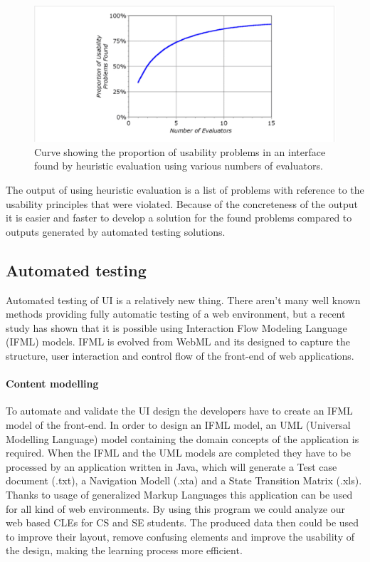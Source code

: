 \documentclass[10pt,english,a4paper]{article}
\begin{document}
\begin{figure}[tbh]
    \includegraphics[width=1\textwidth]{images/heuristic-results.pdf}
    \caption{Curve showing the proportion of usability problems in an interface
     found by heuristic evaluation using various numbers of evaluators\cite{a2020_heuristic}.}
     \label{fig:increase}
\end{figure}
The output of using heuristic evaluation is a list of problems with reference to the usability
principles that were violated\cite{a2020_heuristic}. Because of the concreteness of the output 
it is easier and faster to develop a solution for the found problems compared to outputs generated
by automated testing solutions. 



\subsection{Automated testing}
Automated testing of UI is a relatively new thing\cite{automated_testing_ifml}. There aren't many well known methods
providing fully automatic testing of a web environment, but a recent study has shown that
it is possible using Interaction Flow Modeling Language (IFML) models\cite{automated_testing_ifml}.
IFML is evolved from WebML and its designed to capture the structure, user interaction and control
flow of the front-end of web applications\cite{automated_testing_ifml}.


\paragraph{Content modelling}
To automate and validate the UI design the developers have to create an IFML model
of the front-end. In order to design an IFML model, an UML (Universal Modelling Language) model 
containing the domain concepts of the application is required\cite{automated_testing_ifml}. 
When the IFML and the UML models are completed they have to be processed by an application written 
in Java, which will generate a Test case document (.txt), a Navigation Modell (.xta) and a State Transition 
Matrix (.xls)\cite{automated_testing_ifml}. 
Thanks to usage of generalized Markup Languages this application can be used for all kind of web environments. 
By using this program we could analyze our web based CLEs for CS and SE students. 
The produced data then could be used to improve their layout, remove confusing elements and improve the usability of the design,
making the learning process more efficient.
\end{document}
